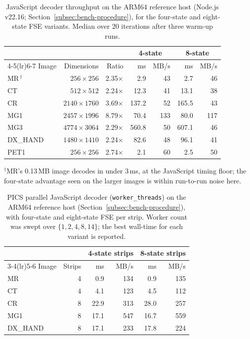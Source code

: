 \documentclass[journal]{IEEEtran}
\begin{document}
\begin{table}[htbp]
\centering
\caption{JavaScript decoder throughput on the ARM64 reference host
(Node.js v22.16; Section~\ref{subsec:bench-procedure}), for the four-state and
eight-state FSE variants. Median over 20 iterations after three warm-up runs.}
\label{tab:js-perf}
\begin{tabular}{lrrrrrr}
\toprule
 & & & \multicolumn{2}{c}{4-state} & \multicolumn{2}{c}{8-state} \\
\cmidrule(lr){4-5}\cmidrule(lr){6-7}
Image & Dimensions & Ratio & ms & MB/s & ms & MB/s \\
\midrule
MR\,$^\dagger$ & $256{\times}256$   & 2.35$\times$ &   2.9 &  43 &   2.7 &  46 \\
CT  & $512{\times}512$   & 2.24$\times$ &  12.3 &  41 &  13.1 &  38 \\
CR  & $2140{\times}1760$ & 3.69$\times$ & 137.2 &  52 & 165.5 &  43 \\
MG1 & $2457{\times}1996$ & 8.79$\times$ &  70.4 & 133 &  80.0 & 117 \\
MG3 & $4774{\times}3064$ & 2.29$\times$ & 560.8 &  50 & 607.1 &  46 \\
DX\_HAND & $1480{\times}1410$ & 2.24$\times$ &  82.6 &  48 &  96.1 &  41 \\
PET1 & $256{\times}256$   & 2.74$\times$ &   2.1 &  60 &   2.5 &  50 \\
\bottomrule
\end{tabular}

\vspace{2pt}
{\scriptsize $^\dagger$MR's 0.13\,MB image decodes in under 3\,ms, at the
JavaScript timing floor; the four-state advantage seen on the larger images
is within run-to-run noise here.}
\end{table}

\begin{table}[htbp]
\centering
\caption{PICS parallel JavaScript decoder (\texttt{worker\_threads}) on
the ARM64 reference host (Section~\ref{subsec:bench-procedure}), with
four-state and eight-state FSE per strip. Worker count was swept over
$\{1,2,4,8,14\}$; the best wall-time for each variant is reported.}
\label{tab:pics-js}
\begin{tabular}{lrrrrr}
\toprule
 & & \multicolumn{2}{c}{4-state strips} & \multicolumn{2}{c}{8-state strips} \\
\cmidrule(lr){3-4}\cmidrule(lr){5-6}
Image & Strips &   ms & MB/s &   ms & MB/s \\
\midrule
MR  & 4 &   0.9 & 134 &   0.9 & 135 \\
CT  & 4 &   4.1 & 123 &   4.5 & 112 \\
CR  & 8 &  22.9 & 313 &  28.0 & 257 \\
MG1 & 8 &  17.1 & 547 &  16.7 & 559 \\
DX\_HAND & 8 &  17.1 & 233 &  17.8 & 224 \\
\bottomrule
\end{tabular}
\end{table}
\end{document}
